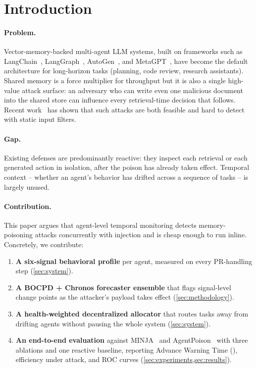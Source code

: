 \section{Introduction}
\label{sec:intro}

\paragraph{Problem.}
Vector-memory-backed multi-agent LLM systems, built on frameworks
such as LangChain~\citep{langchain}, LangGraph~\citep{langgraph},
AutoGen~\citep{autogen}, and MetaGPT~\citep{metagpt}, have become the
default architecture for long-horizon tasks (planning, code review,
research assistants). Shared memory is a force multiplier for
throughput but it is also a single high-value attack surface: an
adversary who can write even one malicious document into the shared
store can influence every retrieval-time decision that follows.
Recent work~\citep{minja,agentpoison,amemguard} has shown that such
attacks are both feasible and hard to detect with static input
filters.

\paragraph{Gap.}
Existing defenses are predominantly reactive: they inspect each
retrieval or each generated action in isolation, after the poison has
already taken effect. Temporal context -- whether an agent's behavior
has drifted across a sequence of tasks -- is largely unused.

\paragraph{Contribution.}
This paper argues that agent-level temporal monitoring detects
memory-poisoning attacks concurrently with injection and is cheap
enough to run inline. Concretely, we contribute:
\begin{enumerate}
  \item \textbf{A six-signal behavioral profile} per agent, measured
  on every PR-handling step (\cref{sec:system}).
  \item \textbf{A BOCPD + Chronos forecaster ensemble} that flags
  signal-level change points as the attacker's payload takes effect (\cref{sec:methodology}).
  \item \textbf{A health-weighted decentralized allocator} that routes
  tasks away from drifting agents without pausing the whole system
  (\cref{sec:system}).
  \item \textbf{An end-to-end evaluation} against
  MINJA~\citep{minja} and AgentPoison~\citep{agentpoison} with three
  ablations and one reactive baseline, reporting Advance Warning
  Time (\awt{}), efficiency under attack, and ROC curves
  (\cref{sec:experiments,sec:results}).
\end{enumerate}

